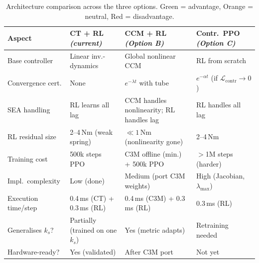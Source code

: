 \documentclass[11pt,a4paper]{article}
\begin{document}
\begin{table}[ht]
\centering
\renewcommand{\arraystretch}{1.35}
\caption{Architecture comparison across the three options.
  \textcolor{contbar}{Green} = advantage,
  \textcolor{orange!80!black}{Orange} = neutral,
  \textcolor{red!70!black}{Red} = disadvantage.}
\label{tab:comparison}
\small
\begin{tabular}{p{3.1cm} p{3.5cm} p{3.5cm} p{3.5cm}}
\toprule
\textbf{Aspect}
  & \textbf{CT + RL} \newline \textit{(current)}
  & \textbf{CCM + RL} \newline \textit{(Option B)}
  & \textbf{Contr.\ PPO} \newline \textit{(Option C)} \\
\midrule
Base controller
  & Linear inv.-dynamics
  & \textcolor{contbar}{Global nonlinear CCM}
  & RL from scratch \\
Convergence cert.
  & \textcolor{red!70!black}{None}
  & \textcolor{contbar}{$e^{-\lambda t}$ with tube}
  & \textcolor{contbar}{$e^{-\alpha t}$ (if $\mathcal{L}_{\mathrm{contr}} \to 0$)} \\
SEA handling
  & RL learns all lag
  & \textcolor{contbar}{CCM handles nonlinearity; RL handles lag}
  & RL handles all lag \\
RL residual size
  & \textcolor{red!70!black}{2--4\,Nm (weak spring)}
  & \textcolor{contbar}{$\ll 1\,\text{Nm}$ (nonlinearity gone)}
  & \textcolor{red!70!black}{2--4\,Nm} \\
Training cost
  & 500k steps PPO
  & \textcolor{orange!80!black}{C3M offline (min.) + 500k PPO}
  & \textcolor{red!70!black}{$>$1M steps (harder)} \\
Impl.\ complexity
  & \textcolor{contbar}{Low (done)}
  & \textcolor{orange!80!black}{Medium (port C3M weights)}
  & \textcolor{red!70!black}{High (Jacobian, $\lambda_{\max}$)} \\
Execution time/step
  & 0.4\,ms (CT) + 0.3\,ms (RL)
  & \textcolor{contbar}{0.4\,ms (C3M) + 0.3\,ms (RL)}
  & 0.3\,ms (RL) \\
Generalises $k_s$?
  & \textcolor{orange!80!black}{Partially (trained on one $k_s$)}
  & \textcolor{contbar}{Yes (metric adapts)}
  & \textcolor{orange!80!black}{Retraining needed} \\
Hardware-ready?
  & \textcolor{contbar}{Yes (validated)}
  & \textcolor{orange!80!black}{After C3M port}
  & \textcolor{red!70!black}{Not yet} \\
\bottomrule
\end{tabular}
\end{table}
\end{document}
